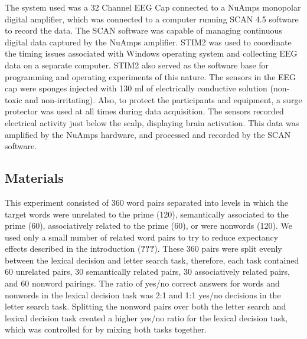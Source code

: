 \documentclass[english,man]{apa6}
\theoremstyle{definition}
\theoremstyle{definition}
\theoremstyle{definition}
\theoremstyle{remark}
\begin{document}
The system used was a 32 Channel EEG Cap connected to a NuAmps monopolar
digital amplifier, which was connected to a computer running SCAN 4.5
software to record the data. The SCAN software was capable of managing
continuous digital data captured by the NuAmps amplifier. STIM2 was used
to coordinate the timing issues associated with Windows operating system
and collecting EEG data on a separate computer. STIM2 also served as the
software base for programming and operating experiments of this nature.
The sensors in the EEG cap were sponges injected with 130 ml of
electrically conductive solution (non-toxic and non-irritating). Also,
to protect the participants and equipment, a surge protector was used at
all times during data acquisition. The sensors recorded electrical
activity just below the scalp, displaying brain activation. This data
was amplified by the NuAmps hardware, and processed and recorded by the
SCAN software.

\subsection{Materials}\label{materials}

This experiment consisted of 360 word pairs separated into levels in
which the target words were unrelated to the prime (120), semantically
associated to the prime (60), associatively related to the prime (60),
or were nonwords (120). We used only a small number of related word
pairs to try to reduce expectancy effects described in the introduction
({\textbf{???}}). These 360 pairs were split evenly between the lexical
decision and letter search task, therefore, each task contained 60
unrelated pairs, 30 semantically related pairs, 30 associatively related
pairs, and 60 nonword pairings. The ratio of yes/no correct answers for
words and nonwords in the lexical decision task was 2:1 and 1:1 yes/no
decisions in the letter search task. Splitting the nonword pairs over
both the letter search and lexical decision task created a higher yes/no
ratio for the lexical decision task, which was controlled for by mixing
both tasks together.
\end{document}
